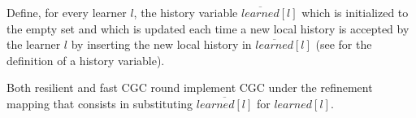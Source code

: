 Define, for every learner $l$, the history variable $\overline{learned}\left[ l \right]$ which is initialized to the empty set and which is
updated each time a new local history is accepted by the learner $l$ by
inserting the new local history in $\overline{learned}\left[ l \right]$ (see \cite{AbadiLamport91ExistenceRefinementMappings} for the
definition of a history variable).
\begin{thm}
  \label{thm:rounds}
    Both resilient and fast CGC round implement CGC under the refinement
    mapping that consists in substituting $\overline{learned\left[ l \right]}$
    for $learned\left[ l \right]$.
\end{thm}


\begin{comment}
\section{Examples of Concrete CGC Algorithms}
\label{sec:examples}

In this section we show how to modify the rounds of Classic Paxos,
Multi-Coordinated Paxos, Chain Replication, Ring Paxos, and Fast Paxos to obtain
CGC round. \Cref{thm:comp} then guarantee that all those different types of
rounds can be used in the same algorithm to yield an implementation of Chain
Agreement.

\subsection{Classic Paxos}

The rounds of the Classic Paxos algorithm can be modified so as to
obtain an implementation of resilient CGC round.  We define
Classic Paxos CGC round by specializing the specification of
resilient CGC round, giving a concrete protocol for disseminating
the proposed commands to the acceptors and enforcing that the learned
histories form a chain.

Each Classic Paxos round has a unique leader among the acceptors which
centrally orders the proposed commands, which are accepted by the
other acceptors in the order determined by the leader.  This protocol
ensures that every local acceptor history is a prefix of the local
history of the leader, therefore guaranteeing that the local acceptor histories
forming a chain.

Acceptor broadcast each newly accepted history to the learners, which
learn a history $h$ when they receive enough extensions of $h$ from the
acceptors.  When instructed by the scheduling policy to abort, a
switcher sends a stop message to the acceptors, which irrevocably stop
updating their local history and send back to the switcher an
acknowledgement containing their local history. A switcher
determines an abort history once it has received acknowledgments from
an abort quorum of acceptors $R$, using the operator $SafeAborts\left(
R \right)$.


\end{comment}

